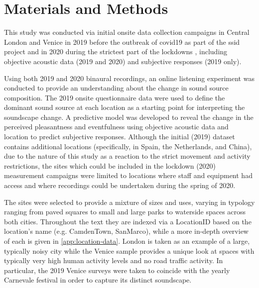 \section{Materials and Methods}

 This study was conducted via initial onsite data collection campaigns in Central London and Venice in 2019 before the outbreak of \gls{covid19} as part of the \gls{ssid} project \citep{Mitchell2020Soundscape} and in 2020 during the strictest part of the lockdowns \citep{Aletta2020Assessing}, including objective acoustic data (2019 and 2020) and subjective responses (2019 only). %
 
 Using both 2019 and 2020 binaural recordings, an online listening experiment was conducted to provide an understanding about the change in sound source composition. The 2019 onsite questionnaire data were used to define the dominant sound source at each location as a starting point for interpreting the soundscape change. A predictive model was developed to reveal the change in the perceived pleasantness and eventfulness using objective acoustic data and location to predict subjective responses. Although the initial (2019) dataset contains additional locations (specifically, in Spain, the Netherlands, and China), due to the nature of this study as a reaction to the strict movement and activity restrictions, the sites which could be included in the lockdown (2020) measurement campaigns were limited to locations where staff and equipment had access and where recordings could be undertaken during the spring of 2020.

 The sites were selected to provide a mixture of sizes and uses, varying in typology ranging from paved squares to small and large parks to waterside spaces across both cities. Throughout the text they are indexed via a LocationID based on the location's name (e.g. CamdenTown, SanMarco), while a more in-depth overview of each is given in \cref{app:location-data}. London is taken as an example of a large, typically noisy city while the Venice sample provides a unique look at spaces with typically very high human activity levels and no road traffic activity. In particular, the 2019 Venice surveys were taken to coincide with the yearly Carnevale festival in order to capture its distinct soundscape.

